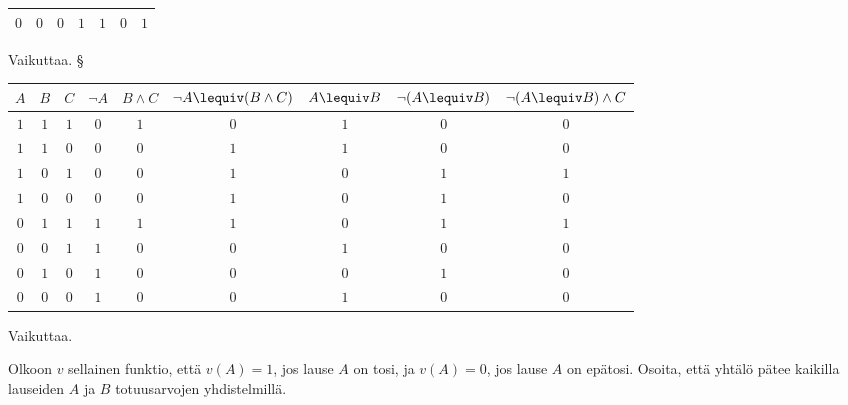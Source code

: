 \begin{kotitehtavasivu}
\begin{tehtava}
\begin{vastaus}
{\begin{center}
\begin{tabular}{|c|c|c|c|c|c|c|}
		    $0$ & $0$ & $0$ & $1$ & $1$ & $0$ & $1$ \\ \hline
\end{tabular}
\end{center}
Vaikuttaa.
            § \begin{center}
		    \begin{tabular}{|c|c|c|c|c|c|c|c|c|}\hline
		    $A$ & $B$ & $C$ & $\lnot A$ & $B\land C$ & $\lnot A \lequiv (B \land C)$ & $A\lequiv B$ & $\lnot (A\lequiv B)$ & $\lnot (A \lequiv B) \land C$ \\ \hline
		    $1$ & $1$ & $1$ & $0$ & $1$ & $0$ & $1$ & $0$ & $0$ \\ %
		    $1$ & $1$ & $0$ & $0$ & $0$ & $1$ & $1$ & $0$ & $0$ \\
		    $1$ & $0$ & $1$ & $0$ & $0$ & $1$ & $0$ & $1$ & $1$ \\
		    $1$ & $0$ & $0$ & $0$ & $0$ & $1$ & $0$ & $1$ & $0$ \\
		    $0$ & $1$ & $1$ & $1$ & $1$ & $1$ & $0$ & $1$ & $1$ \\
		    $0$ & $0$ & $1$ & $1$ & $0$ & $0$ & $1$ & $0$ & $0$ \\
		    $0$ & $1$ & $0$ & $1$ & $0$ & $0$ & $0$ & $1$ & $0$ \\
		    $0$ & $0$ & $0$ & $1$ & $0$ & $0$ & $1$ & $0$ & $0$ \\ \hline
\end{tabular}
\end{center}
Vaikuttaa.

        }
    \end{vastaus}
    
\end{tehtava}

\begin{tehtava}
     Olkoon $v$ sellainen funktio, että $v(A) = 1$, jos lause $A$ on tosi, ja $v(A) = 0$, jos lause $A$ on epätosi. Osoita, että yhtälö pätee kaikilla lauseiden $A$ ja $B$ totuusarvojen yhdistelmillä.

    \begin{vastaus}
    

\end{vastaus}
\end{tehtava}
\end{kotitehtavasivu}
